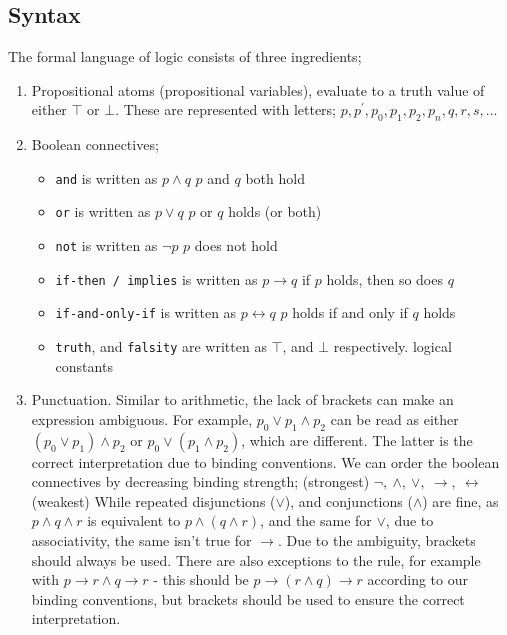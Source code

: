 \documentclass[a4paper, 12pt]{article}
\begin{document}
        \subsection*{Syntax}
        The formal language of logic consists of three ingredients;
        \begin{enumerate}[1.]
            \item Propositional atoms (propositional variables), evaluate to a truth value of either $\top$ or $\bot$. These are represented with letters; $p, p^\prime, p_0, p_1, p_2, p_n, q, r, s, ...$
            \item Boolean connectives;
                \begin{itemize}
                    \item \texttt{and} is written as $p \land q$ \hfill $p$ and $q$ both hold
                    \item \texttt{or} is written as $p \lor q$ \hfill $p$ or $q$ holds (or both)
                    \item \texttt{not} is written as $\neg p$ \hfill $p$ does not hold
                    \item \texttt{if-then / implies} is written as $p \rightarrow q$ \hfill if $p$ holds, then so does $q$
                    \item \texttt{if-and-only-if} is written as $p \leftrightarrow q$ \hfill $p$ holds if and only if $q$ holds
                    \item \texttt{truth}, and \texttt{falsity} are written as $\top$, and $\bot$ respectively. \hfill logical constants
                \end{itemize}
            \item Punctuation. Similar to arithmetic, the lack of brackets can make an expression ambiguous. For example, $p_0 \lor p_1 \land p_2$ can be read as either $(p_0 \lor p_1) \land p_2$ or $p_0 \lor (p_1 \land p_2)$, which are different. The latter is the correct interpretation due to binding conventions.
                \subitem We can order the boolean connectives by decreasing binding strength;
                \subitem (strongest) $\neg,\ \land,\ \lor,\ \rightarrow,\ \leftrightarrow$ (weakest)
                \subitem While repeated disjunctions ($\lor$), and conjunctions ($\land$) are fine, as $p \land q \land r$ is equivalent to $p \land (q \land r)$, and the same for $\lor$, due to associativity, the same isn't true for $\rightarrow$. Due to the ambiguity, brackets should always be used.
                \subitem There are also exceptions to the rule, for example with $p \rightarrow r \land q \rightarrow r$ - this should be $p \rightarrow (r \land q) \rightarrow r$ according to our binding conventions, but brackets should be used to ensure the correct interpretation.
        \end{enumerate}
\end{document}
